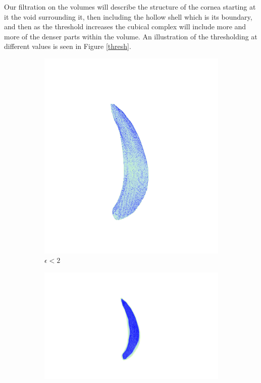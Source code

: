 Our filtration on the volumes will describe the structure of the cornea starting at it the void surrounding it, then including the hollow shell which is its boundary, and then as the threshold increases the cubical complex will include more and more of the denser parts within the volume. An illustration of the thresholding at different values is seen in Figure \ref{thresh}.

\begin{figure}[ht]
  \centering
  \begin{subfigure}{.3 \linewidth}
  \centering
  \includegraphics[scale=0.2]{eps2.png}
  \caption{$\epsilon < 2$}
  \end{subfigure}%
  \begin{subfigure}{.3 \linewidth}
  \centering
  \includegraphics[scale=0.2]{eps10.png}

\end{subfigure}
\end{figure}
